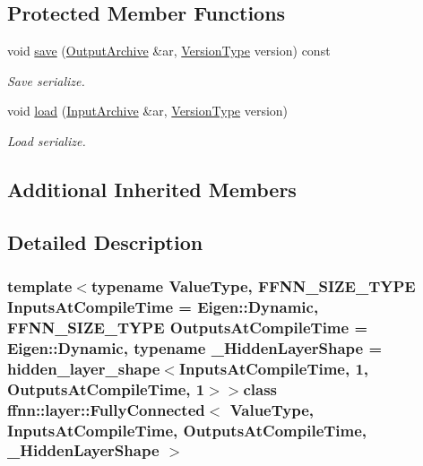 \subsection*{Protected Member Functions}
\begin{DoxyCompactItemize}
\item 
void \hyperlink{classffnn_1_1layer_1_1_fully_connected_a7c79eb99c638b61f76ea34b725c0aeef}{save} (\hyperlink{classffnn_1_1internal_1_1_serializable_acf5baead716eb277337a4437e88a5743}{Output\-Archive} \&ar, \hyperlink{classffnn_1_1internal_1_1_serializable_a32fe7d82b0caf9fe8b6fb7c312a26028}{Version\-Type} version) const 
\begin{DoxyCompactList}\small\item\em Save serialize. \end{DoxyCompactList}\item 
void \hyperlink{classffnn_1_1layer_1_1_fully_connected_a1ff2a601cdf315ce46a2812b4e6fe354}{load} (\hyperlink{classffnn_1_1internal_1_1_serializable_aadc27d79d606f35a82dd88bad33fa6d2}{Input\-Archive} \&ar, \hyperlink{classffnn_1_1internal_1_1_serializable_a32fe7d82b0caf9fe8b6fb7c312a26028}{Version\-Type} version)
\begin{DoxyCompactList}\small\item\em Load serialize. \end{DoxyCompactList}\end{DoxyCompactItemize}
\subsection*{Additional Inherited Members}


\subsection{Detailed Description}
\subsubsection*{template$<$typename Value\-Type, F\-F\-N\-N\-\_\-\-S\-I\-Z\-E\-\_\-\-T\-Y\-P\-E Inputs\-At\-Compile\-Time = Eigen\-::\-Dynamic, F\-F\-N\-N\-\_\-\-S\-I\-Z\-E\-\_\-\-T\-Y\-P\-E Outputs\-At\-Compile\-Time = Eigen\-::\-Dynamic, typename \-\_\-\-Hidden\-Layer\-Shape = hidden\-\_\-layer\-\_\-shape$<$\-Inputs\-At\-Compile\-Time, 1, Outputs\-At\-Compile\-Time, 1$>$$>$class ffnn\-::layer\-::\-Fully\-Connected$<$ Value\-Type, Inputs\-At\-Compile\-Time, Outputs\-At\-Compile\-Time, \-\_\-\-Hidden\-Layer\-Shape $>$}


